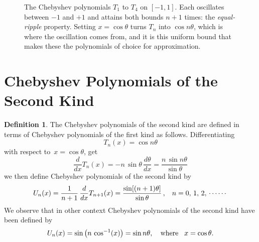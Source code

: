 \documentclass[12pt,a4paper]{report}
\theoremstyle{definition}
\newtheorem{defn}[thm]{Definition}
\theoremstyle{plain}
\begin{document}
\begin{figure}[H]
\centering
{}
\caption{The Chebyshev polynomials $T_1$ to $T_4$ on $[-1,1]$. Each oscillates
between $-1$ and $+1$ and attains both bounds $n+1$ times: the
\emph{equal-ripple} property. Setting $x=\cos\theta$ turns $T_n$ into
$\cos n\theta$, which is where the oscillation comes from, and it is this
uniform bound that makes these the polynomials of choice for approximation.}
\label{fig:chebyshev}
\end{figure}

\section{Chebyshev Polynomials of the Second Kind}
\begin{defn}
The Chebyshev polynomials of the second kind are defined in terms of Chebyshev polynomials of the first kind as follows. Differentiating $$T_n(x) = \cos n\theta$$ with respect to $\, x  = \cos \theta$, get
$$\frac{d}{dx} T_n(x)  = -n\, \sin \theta\, \frac{d\theta}{dx} = \frac{n\, \sin n\theta}{\sin \theta}$$
we then define Chebyshev polynomials of the second kind by 
$$U_n(x) = \frac{1}{n + 1}\, \frac{d}{dx}T_{n+1}(x) = \frac{\sin[(n + 1)\theta]}{\sin \theta}\, , \hspace{0.3cm} n = 0, \, 1, \, 2, \, \cdots\cdots$$
We observe that in other context Chebyshev polynomials of the second kind have been defined by 
$$U_n(x) = \sin\left(n\, \cos^{-1}(x)\right) = \sin n\theta, \, \hspace{0.3cm}\text{where}\hspace{0.3cm} x = \cos \theta.$$
\end{defn}
\end{document}
